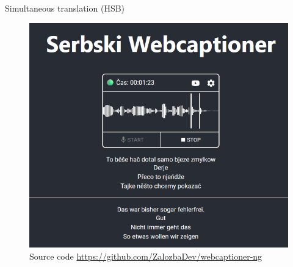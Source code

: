   \begin{block}{Simultaneous translation (HSB)}


    \begin{figure}
        \centering
        \includegraphics[width=0.7\colwidth]{03_z_01_webcaptioner_klein.png}
        \caption{Source code \url{https://github.com/ZalozbaDev/webcaptioner-ng}}
        \label{fig:webcaptioner}
    \end{figure}

  \end{block}
